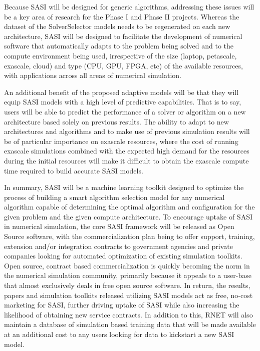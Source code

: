 Because SASI will be designed for generic algorithms, addressing these issues will be a key area of research for the Phase I and Phase II projects. Whereas the dataset of the SolverSelector models needs to be regenerated on each new architecture, SASI will be designed to facilitate the development of numerical software that automatically adapts to the problem being solved and to the compute environment being used, irrespective of the size (laptop, petascale, exascale, cloud) and type (CPU, GPU, FPGA, etc) of the available resources, with applications across all areas of numerical simulation. 

An additional benefit of the proposed adaptive models will be that they will equip SASI models with a high level of predictive capabilities. That is to say, users will be able to predict the performance of a solver or algorithm on a new architecture based solely on previous results. The ability to adapt to new architectures and algorithms and to make use of previous simulation results will be of particular importance on exascale resources, where the cost of running exascale simulations combined with the expected high demand for the resources during the initial resources will make it difficult to obtain the exascale compute time required to build accurate SASI models. 

In summary, SASI will be a machine learning toolkit designed to optimize the process of building a smart algorithm selection model for any numerical algorithm capable of determining the optimal algorithm and configuration for the given problem and the given compute architecture. To encourage uptake of SASI in numerical simulation, the core SASI framework will be released as Open Source software, with the commercialization plan being to offer support, training, extension and/or integration contracts to government agencies and private companies looking for automated optimization of existing simulation toolkits.  Open source, contract based commercialization is quickly becoming the norm in the numerical simulation community, primarily because it appeals to a user-base that almost exclusively deals in free open source software. In return, the results, papers and simulation toolkits released utilizing SASI models act as free, no-cost marketing for SASI, further driving uptake of SASI while also increasing the likelihood of obtaining new service contracts. In addition to this, RNET will also maintain a database of simulation based training data that will be made available at an additional cost to any users looking for data to kickstart a new SASI model. 
